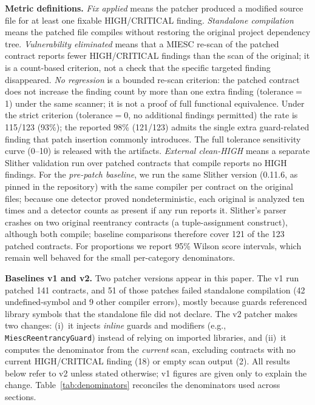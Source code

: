\documentclass[conference]{IEEEtran}
\begin{document}
\textbf{Metric definitions.} \emph{Fix applied} means the patcher produced a modified source file for at least one fixable HIGH/CRITICAL finding. \emph{Standalone compilation} means the patched file compiles without restoring the original project dependency tree. \emph{Vulnerability eliminated} means that a MIESC re-scan of the patched contract reports fewer HIGH/CRITICAL findings than the scan of the original; it is a count-based criterion, not a check that the specific targeted finding disappeared. \emph{No regression} is a bounded re-scan criterion: the patched contract does not increase the finding count by more than one extra finding (tolerance$=$1) under the same scanner; it is not a proof of full functional equivalence. Under the strict criterion (tolerance$=$0, no additional findings permitted) the rate is 115/123 (93\%); the reported 98\% (121/123) admits the single extra guard-related finding that patch insertion commonly introduces. The full tolerance sensitivity curve (0--10) is released with the artifacts. \emph{External clean-HIGH} means a separate Slither validation run over patched contracts that compile reports no HIGH findings. For the \emph{pre-patch baseline}, we run the same Slither version (0.11.6, as pinned in the repository) with the same compiler per contract on the original files; because one detector proved nondeterministic, each original is analyzed ten times and a detector counts as present if any run reports it. Slither's parser crashes on two original reentrancy contracts (a tuple-assignment construct), although both compile; baseline comparisons therefore cover 121 of the 123 patched contracts. For proportions we report 95\% Wilson score intervals, which remain well behaved for the small per-category denominators.

\textbf{Baselines v1 and v2.} Two patcher versions appear in this paper. The v1 run patched 141 contracts, and 51 of those patches failed standalone compilation (42 undefined-symbol and 9 other compiler errors), mostly because guards referenced library symbols that the standalone file did not declare. The v2 patcher makes two changes: (i)~it injects \emph{inline} guards and modifiers (e.g., \texttt{MiescReentrancyGuard}) instead of relying on imported libraries, and (ii)~it computes the denominator from the \emph{current} scan, excluding contracts with no current HIGH/CRITICAL finding (18) or empty scan output (2). All results below refer to v2 unless stated otherwise; v1 figures are given only to explain the change. Table~\ref{tab:denominators} reconciles the denominators used across sections.
\end{document}
